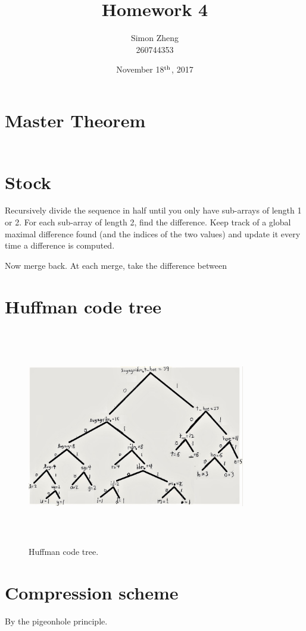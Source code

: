 \documentclass[11pt,letterpaper]{article}
\author{Simon Zheng\\260744353}
\title{Homework 4}
\date{November 18$^{\textnormal{th}}$, 2017}
\begin{document}
	\maketitle
	\thispagestyle{fancy}
	
	\section{Master Theorem}
		\begin{align*}
			\
		\end{align*}
	
	\section{Stock}
		Recursively divide the sequence in half until you only have sub-arrays of length 1 or 2.
		For each sub-array of length 2, find the difference.
		Keep track of a global maximal difference found (and the indices of the two values) and update it every time a difference is computed.
		
		Now merge back.
		At each merge, take the difference between
		
	\section{Huffman code tree}
		\begin{figure}[h]
			\centering
			\includegraphics[width=360px,height=360px,keepaspectratio]{huffmancodetree.jpg}
			\linespread{0.8}\caption{Huffman code tree.}
		\end{figure}
	
	\section{Compression scheme}
		By the pigeonhole principle.
		
\end{document}
